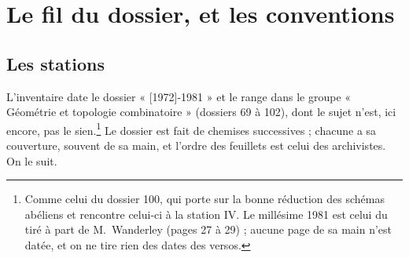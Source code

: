 \documentclass[11pt,a4paper]{article}
\begin{document}
\section*{Le fil du dossier, et les conventions}

\subsection*{Les stations}

L'inventaire date le dossier « [1972]-1981 » et le range dans le groupe
« Géométrie et topologie combinatoire » (dossiers 69 à 102), dont le sujet
n'est, ici encore, pas le sien.\footnote{Comme celui du dossier 100, qui porte
sur la bonne réduction des schémas abéliens et rencontre celui-ci à la
station IV. Le millésime 1981 est celui du tiré à part de M.~Wanderley
(pages 27 à 29) ; aucune page de sa main n'est datée, et on ne tire rien des
dates des versos.} Le dossier est fait de chemises successives ; chacune a sa
couverture, souvent de sa main, et l'ordre des feuillets est celui des
archivistes. On le suit.
\end{document}
